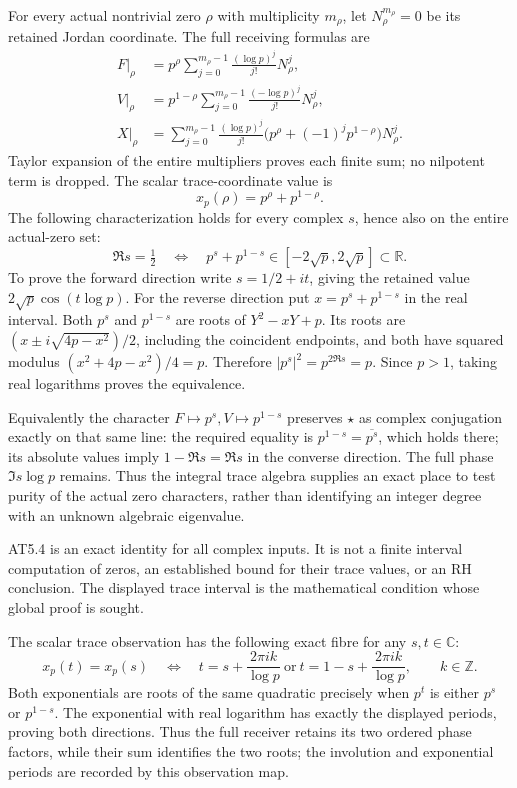 \documentclass[
]{article}
\begin{document}
For every actual nontrivial zero \(\rho\) with multiplicity \(m_\rho\),
let \(N_\rho^{m_\rho}=0\) be its retained Jordan coordinate. The full
receiving formulas are \[
\begin{split}
F|_\rho&=p^\rho\sum_{j=0}^{m_\rho-1}\frac{(\log p)^j}{j!}N_\rho^j,\\
V|_\rho&=p^{1-\rho}\sum_{j=0}^{m_\rho-1}\frac{(-\log p)^j}{j!}N_\rho^j,\\
X|_\rho&=\sum_{j=0}^{m_\rho-1}
\frac{(\log p)^j}{j!}\bigl(p^\rho+(-1)^jp^{1-\rho}\bigr)N_\rho^j.
\end{split}
\tag{AT5.2}
\] Taylor expansion of the entire multipliers proves each finite sum; no
nilpotent term is dropped. The scalar trace-coordinate value is \[
x_p(\rho)=p^\rho+p^{1-\rho}.
\tag{AT5.3}
\] The following characterization holds for every complex \(s\), hence
also on the entire actual-zero set: \[
\boxed{\Re s=\tfrac12
\quad\Longleftrightarrow\quad
p^s+p^{1-s}\in[-2\sqrt p,2\sqrt p]\subset\mathbb R.}
\tag{AT5.4}
\] To prove the forward direction write \(s=1/2+it\), giving the
retained value \(2\sqrt p\cos(t\log p)\). For the reverse direction put
\(x=p^s+p^{1-s}\) in the real interval. Both \(p^s\) and \(p^{1-s}\) are
roots of \(Y^2-xY+p\). Its roots are \((x\pm i\sqrt{4p-x^2})/2\),
including the coincident endpoints, and both have squared modulus
\((x^2+4p-x^2)/4=p\). Therefore \(|p^s|^2=p^{2\Re s}=p\). Since \(p>1\),
taking real logarithms proves the equivalence.

Equivalently the character \(F\mapsto p^s,V\mapsto p^{1-s}\) preserves
\(\star\) as complex conjugation exactly on that same line: the required
equality is \(p^{1-s}=\overline{p^s}\), which holds there; its absolute
values imply \(1-\Re s=\Re s\) in the converse direction. The full phase
\(\Im s\log p\) remains. Thus the integral trace algebra supplies an
exact place to test purity of the actual zero characters, rather than
identifying an integer degree with an unknown algebraic eigenvalue.

AT5.4 is an exact identity for all complex inputs. It is not a finite
interval computation of zeros, an established bound for their trace
values, or an RH conclusion. The displayed trace interval is the
mathematical condition whose global proof is sought.

The scalar trace observation has the following exact fibre for any
\(s,t\in\mathbb C\): \[
x_p(t)=x_p(s)\quad\Longleftrightarrow\quad
t=s+\frac{2\pi i k}{\log p}\ \text{or}\
t=1-s+\frac{2\pi i k}{\log p},\qquad k\in\mathbb Z.
\tag{AT5.5}
\] Both exponentials are roots of the same quadratic precisely when
\(p^t\) is either \(p^s\) or \(p^{1-s}\). The exponential with real
logarithm has exactly the displayed periods, proving both directions.
Thus the full receiver retains its two ordered phase factors, while
their sum identifies the two roots; the involution and exponential
periods are recorded by this observation map.
\end{document}

